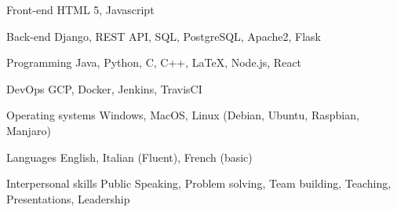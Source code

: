 

\begin{cvskills}

  \cvskill
    {Front-end} %
    {HTML 5, Javascript} %

  \cvskill
    {Back-end} %
    {Django, REST API, SQL, PostgreSQL, Apache2, Flask} %

  \cvskill
    {Programming} %
    {Java, Python, C, C++, LaTeX, Node.js, React} %

    \cvskill
    {DevOps}
    {GCP, Docker, Jenkins, TravisCI}
    
    \cvskill
    {Operating systems}
    {Windows, MacOS, Linux (Debian, Ubuntu, Raspbian, Manjaro)}
    
  \cvskill
    {Languages} %
    {English, Italian (Fluent), French (basic)} %

    \cvskill
    {Interpersonal skills}
    {Public Speaking, Problem solving, Team building, Teaching, Presentations, Leadership}
    
\end{cvskills}
